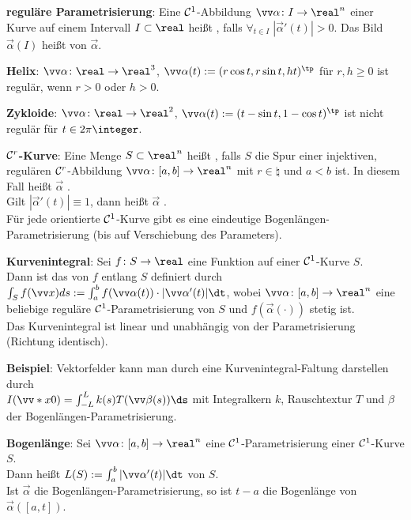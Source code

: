 \textbf{reguläre Parametrisierung}:
Eine $\mathcal{C}^1$-Abbildung $\vec{\alpha}\colon I \to \real^n$ einer Kurve
auf einem Intervall $I \subset \real$ heißt , falls
$\forall_{t \in I}\; |\vec{\alpha}'(t)| > 0$.
Das Bild $\vec{\alpha}(I)$ heißt  von $\vec{\alpha}$.

\textbf{Helix}:
$\vec{\alpha}\colon \real \to \real^3$, $\vec{\alpha}(t) := (r \cos t, r \sin t, ht)^\tp$
für $r, h \ge 0$ ist regulär, wenn $r > 0$ oder $h > 0$.

\textbf{Zykloide}:
$\vec{\alpha}\colon \real \to \real^2$, $\vec{\alpha}(t) := (t - \sin t, 1 - \cos t)^\tp$
ist nicht regulär für $t \in 2\pi\integer$.

\textbf{$\mathcal{C}^r$-Kurve}:
Eine Menge $S \subset \real^n$ heißt , falls $S$ die Spur
einer injektiven, regulären $\mathcal{C}^r$-Abbildung $\vec{\alpha}\colon [a, b] \to \real^n$
mit $r \in \natural$ und $a < b$ ist.
In diesem Fall heißt $\vec{\alpha}$ .\\
Gilt $|\vec{\alpha}'(t)| \equiv 1$, dann heißt $\vec{\alpha}$
.\\
Für jede orientierte $\mathcal{C}^1$-Kurve gibt es eine eindeutige Bogenlängen-Parametrisierung
(bis auf Verschiebung des Parameters).

\linie

\textbf{Kurvenintegral}:
Sei $f\colon S \to \real$ eine Funktion auf einer $\mathcal{C}^1$-Kurve $S$.\\
Dann ist das  von $f$ entlang $S$ definiert durch
$\int_S f(\vec{x}) ds := \int_a^b f(\vec{\alpha}(t)) \cdot |\vec{\alpha}'(t)| \dt$,
wobei $\vec{\alpha}\colon [a, b] \to \real^n$ eine beliebige reguläre $\mathcal{C}^1$-Parametrisierung
von $S$ und $f(\vec{\alpha}(\cdot))$ stetig ist.\\
Das Kurvenintegral ist linear und unabhängig von der Parametrisierung
(Richtung identisch).

\textbf{Beispiel}:
Vektorfelder kann man durch eine Kurvenintegral-Faltung darstellen durch\\
$I(\vec*{x}{0}) = \int_{-L}^L k(s) T(\vec{\beta}(s)) \ds$ mit
Integralkern $k$, Rauschtextur $T$ und $\beta$ der Bogenlängen-Parametrisierung.

\linie

\textbf{Bogenlänge}:
Sei $\vec{\alpha}\colon [a, b] \to \real^n$ eine $\mathcal{C}^1$-Parametrisierung einer $\mathcal{C}^1$-Kurve $S$.\\
Dann heißt $L(S) := \int_a^b |\vec{\alpha}'(t)| \dt$  von $S$.\\
Ist $\vec{\alpha}$ die Bogenlängen-Parametrisierung, so ist
$t - a$ die Bogenlänge von $\vec{\alpha}([a, t])$.

